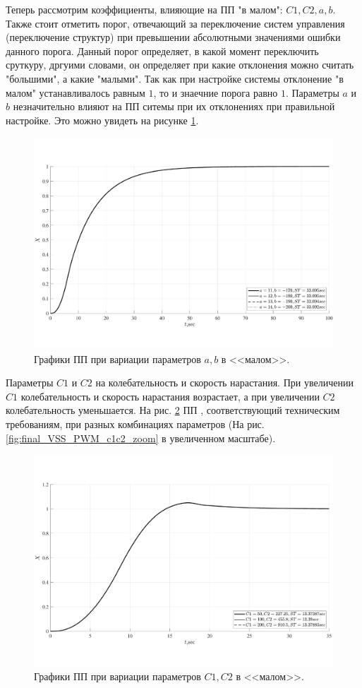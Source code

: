 Теперь рассмотрим коэффициенты, влияющие на ПП "в малом": $C1,C2,a,b$. Также стоит отметить порог, отвечающий за переключение систем управления (переключение структур) при превышении абсолютными значениями ошибки данного порога. Данный порог определяет, в какой момент переключить сруткуру, дргуими словами, он определяет при какие отклонения можно считать "большими", а какие "малыми". Так как при настройке системы отклонение "в малом" устанавливалось равным $1$, то и знаечние порога равно $1$. 
Параметры $a$ и $b$ незначительно влияют на ПП ситемы  при их отклонениях при правильной настройке.
Это можно увидеть на рисунке \ref{fig:final_VSS_PWM_ab}. 
\begin{figure}[!h]\centering
	\includegraphics[width=1\linewidth]{images/final_VSS_PWM_ab}
	\caption{ Графики ПП при вариации параметров $a,b$ в <<малом>>.}\label{fig:final_VSS_PWM_ab}
\end{figure}
Параметры $C1$ и $C2$ на колебательность и скорость нарастания. При увеличении $C1$ колебательность и скорость нарастания возрастает, а при увеличении $C2$ колебательность уменьшается. На рис. \ref{fig:final_VSS_PWM_c1c2} ПП ,  соответствующий техническим требованиям, при разных комбинациях параметров (На рис.\ref{fig:final_VSS_PWM_c1c2_zoom} в увеличенном масштабе). 
\begin{figure}[!h]\centering
	\includegraphics[width=1\linewidth]{images/final_VSS_PWM_c1c2}
	\caption{ Графики ПП при вариации параметров $C1,C2$ в <<малом>>.}\label{fig:final_VSS_PWM_c1c2}
\end{figure}
